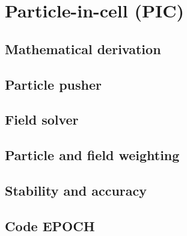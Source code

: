 \documentclass[12pt, twoside, a4paper, openright]{report}
\begin{document}
%

%

%


\chapter{Particle-in-cell (PIC)}


\section{Mathematical derivation}


\section{Particle pusher}


\section{Field solver}


\section{Particle and field weighting}


\section{Stability and accuracy}


\section{Code EPOCH}

\end{document}
